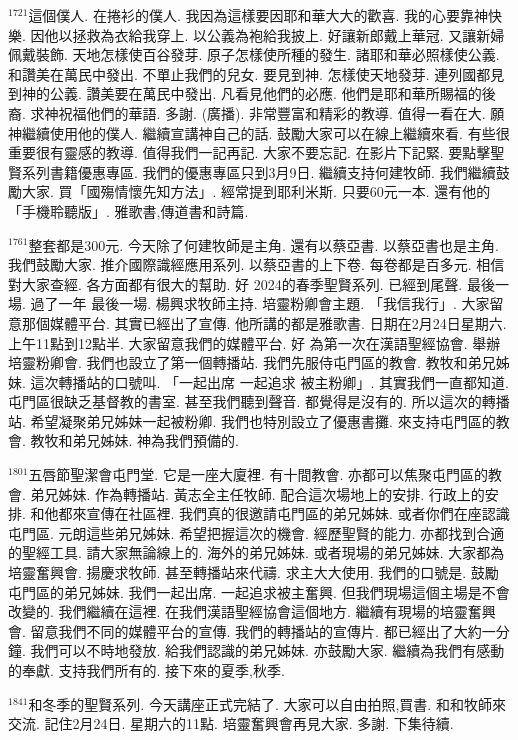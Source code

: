 \documentclass{book}
\begin{document}
$^{1721}$這個僕人.
在捲衫的僕人.
我因為這樣要因耶和華大大的歡喜.
我的心要靠神快樂.
因他以拯救為衣給我穿上.
以公義為袍給我披上.
好讓新郎戴上華冠.
又讓新婦佩戴裝飾.
天地怎樣使百谷發芽.
原子怎樣使所種的發生.
諸耶和華必照樣使公義.
和讚美在萬民中發出.
不單止我們的兒女.
要見到神.
怎樣使天地發芽.
連列國都見到神的公義.
讚美要在萬民中發出.
凡看見他們的必應.
他們是耶和華所賜福的後裔.
求神祝福他們的華語.
多謝.
(廣播).
非常豐富和精彩的教導.
值得一看在大.
願神繼續使用他的僕人.
繼續宣講神自己的話.
鼓勵大家可以在線上繼續來看.
有些很重要很有靈感的教導.
值得我們一記再記.
大家不要忘記.
在影片下記緊.
要點擊聖賢系列書籍優惠專區.
我們的優惠專區只到3月9日.
繼續支持何建牧師.
我們繼續鼓勵大家.
買「國殤情懷先知方法」.
經常提到耶利米斯.
只要60元一本.
還有他的「手機聆聽版」.
雅歌書,傳道書和詩篇.

$^{1761}$整套都是300元.
今天除了何建牧師是主角.
還有以蔡亞書.
以蔡亞書也是主角.
我們鼓勵大家.
推介國際識經應用系列.
以蔡亞書的上下卷.
每卷都是百多元.
相信對大家查經.
各方面都有很大的幫助.
好 2024的春季聖賢系列.
已經到尾聲.
最後一場.
過了一年 最後一場.
楊興求牧師主持.
培靈粉卿會主題.
「我信我行」.
大家留意那個媒體平台.
其實已經出了宣傳.
他所講的都是雅歌書.
日期在2月24日星期六.
上午11點到12點半.
大家留意我們的媒體平台.
好 為第一次在漢語聖經協會.
舉辦培靈粉卿會.
我們也設立了第一個轉播站.
我們先服侍屯門區的教會.
教牧和弟兄姊妹.
這次轉播站的口號叫.
「一起出席 一起追求 被主粉卿」.
其實我們一直都知道.
屯門區很缺乏基督教的書室.
甚至我們聽到聲音.
都覺得是沒有的.
所以這次的轉播站.
希望凝聚弟兄姊妹一起被粉卿.
我們也特別設立了優惠書攤.
來支持屯門區的教會.
教牧和弟兄姊妹.
神為我們預備的.

$^{1801}$五唇節聖潔會屯門堂.
它是一座大廈裡.
有十間教會.
亦都可以焦聚屯門區的教會.
弟兄姊妹.
作為轉播站.
黃志全主任牧師.
配合這次場地上的安排.
行政上的安排.
和他都來宣傳在社區裡.
我們真的很邀請屯門區的弟兄姊妹.
或者你們在座認識屯門區.
元朗這些弟兄姊妹.
希望把握這次的機會.
經歷聖賢的能力.
亦都找到合適的聖經工具.
請大家無論線上的.
海外的弟兄姊妹.
或者現場的弟兄姊妹.
大家都為培靈奮興會.
揚慶求牧師.
甚至轉播站來代禱.
求主大大使用.
我們的口號是.
鼓勵屯門區的弟兄姊妹.
我們一起出席.
一起追求被主奮興.
但我們現場這個主場是不會改變的.
我們繼續在這裡.
在我們漢語聖經協會這個地方.
繼續有現場的培靈奮興會.
留意我們不同的媒體平台的宣傳.
我們的轉播站的宣傳片.
都已經出了大約一分鐘.
我們可以不時地發放.
給我們認識的弟兄姊妹.
亦鼓勵大家.
繼續為我們有感動的奉獻.
支持我們所有的.
接下來的夏季,秋季.

$^{1841}$和冬季的聖賢系列.
今天講座正式完結了.
大家可以自由拍照,買書.
和和牧師來交流.
記住2月24日.
星期六的11點.
培靈奮興會再見大家.
多謝.
下集待續.
\newpage
\end{document}
